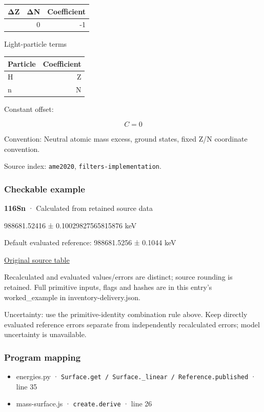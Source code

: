 \documentclass[
  11pt,
  letterpaper,
]{article}
\providecommand{\tightlist}{%
  \setlength{\itemsep}{0pt}\setlength{\parskip}{0pt}}
\begin{document}
\begin{longtable}[]{@{}rrr@{}}
\toprule\noalign{}
ΔZ & ΔN & Coefficient \\
\midrule\noalign{}
\endhead
\bottomrule\noalign{}
\endlastfoot
0 & 0 & -1 \\
\end{longtable}

Light-particle terms

\begin{longtable}[]{@{}lr@{}}
\toprule\noalign{}
Particle & Coefficient \\
\midrule\noalign{}
\endhead
\bottomrule\noalign{}
\endlastfoot
H & Z \\
n & N \\
\end{longtable}

Constant offset:

\[
C=0
\]

Convention: Neutral atomic mass excess, ground states, fixed Z/N
coordinate convention.

Source index: \texttt{ame2020}, \texttt{filters-implementation}.

\subsubsection{Checkable example}\label{checkable-example-1}

\textbf{116Sn} · Calculated from retained source data

988681.52416 ± 0.10029827565815876 keV

Default evaluated reference: 988681.5256 ± 0.1044 keV

\href{https://www-nds.iaea.org/amdc/ame2020/mass_1.mas20.txt}{Original
source table}

Recalculated and evaluated values/errors are distinct; source rounding
is retained. Full primitive inputs, flags and hashes are in this entry's
worked\_example in inventory-delivery.json.

Uncertainty: use the primitive-identity combination rule above. Keep
directly evaluated reference errors separate from independently
recalculated errors; model uncertainty is unavailable.

\subsubsection{Program mapping}\label{program-mapping-1}

\begin{itemize}
\tightlist
\item
  energies.py ·
  \texttt{Surface.get\ /\ Surface.\_linear\ /\ Reference.published} ·
  line 35
\item
  mass-surface.js · \texttt{create.derive} · line 26
\end{itemize}
\end{document}
